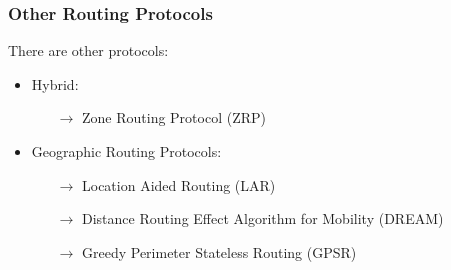 \subsubsection{Other Routing Protocols}
There are other protocols:
\begin{itemize}
    \item Hybrid:
    \begin{itemize}
        \item[$\rightarrow$] Zone Routing Protocol (ZRP)
    \end{itemize}
    \item Geographic Routing Protocols:
    \begin{itemize}
        \item[$\rightarrow$] Location Aided Routing (LAR)
        \item[$\rightarrow$] Distance Routing Effect Algorithm for Mobility (DREAM)
        \item[$\rightarrow$] Greedy Perimeter Stateless Routing (GPSR)
    \end{itemize}
\end{itemize}

